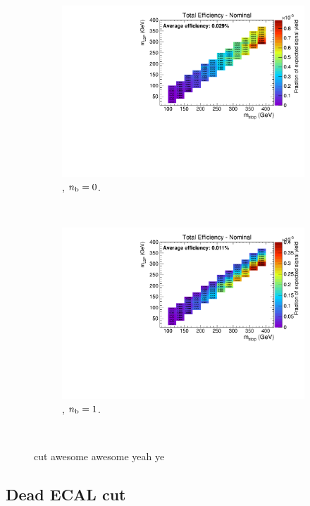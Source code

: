 \begin{figure}[h!]
\begin{subfigure}[b]{0.4\textwidth}
    \includegraphics[width=\textwidth, page=3]{Figs/sms/t2degen/v5/MHT_MET_T2_4body_v5_eq0b_ge4j_incl.pdf}
    \caption{\njhigh, $n_{\text{b}} = 0$.}
  \end{subfigure}\\
  \begin{subfigure}[b]{0.4\textwidth}
    \includegraphics[width=\textwidth, page=3]{Figs/sms/t2degen/v5/MHT_MET_T2_4body_v5_eq1b_ge4j_incl.pdf}
    \caption{\njhigh, $n_{\text{b}} = 1$.}
  \end{subfigure}\\
  \caption{\mhtmet cut awesome awesome yeah ye}
  \label{fig:sms-mhtmet-t2degen}
\end{figure}


\newpage
\subsection*{Dead ECAL cut}
\label{sec:t2degen_deadecal_plots}

